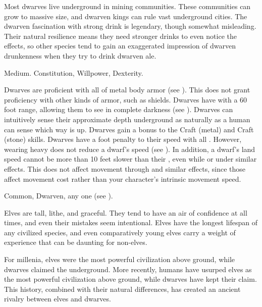   Most dwarves live underground in mining communities.
  These communities can grow to massive size, and dwarven kings can rule vast underground cities.
  The dwarven fascination with strong drink is legendary, though somewhat misleading.
  Their natural resilience means they need stronger drinks to even notice the effects, so other species tend to gain an exaggerated impression of dwarven drunkenness when they try to drink dwarven ale.

   Medium.
    Constitution,  Willpower,  Dexterity.
  \begin{raggeditemize}
     Dwarves are proficient with all  of metal body armor (see ).
      This does not grant proficiency with other kinds of armor, such as shields.
     Dwarves have  with a 60 foot range, allowing them to see in complete darkness (see ).
     Dwarves can intuitively sense their approximate depth underground as naturally as a human can sense which way is up.
     Dwarves gain a  bonus to the Craft (metal) and Craft (stone) skills.
     Dwarves have a  foot penalty to their speed with all .
      However, wearing heavy  does not reduce a dwarf's speed (see ).
      In addition, a dwarf's land speed cannot be more than 10 feet slower than their , even while \slowed or under similar effects.
      This does not affect movement through  and similar effects, since those affect movement cost rather than your character's intrinsic movement speed.
  \end{raggeditemize}
   Common, Dwarven, any one  (see ).


  Elves are tall, lithe, and graceful.
  They tend to have an air of confidence at all times, and even their mistakes seem intentional.
  Elves have the longest lifespan of any civilized species, and even comparatively young elves carry a weight of experience that can be daunting for non-elves.

  For millenia, elves were the most powerful civilization above ground, while dwarves claimed the underground.
  More recently, humans have usurped elves as the most powerful civilization above ground, while dwarves have kept their claim.
  This history, combined with their natural differences, has created an ancient rivalry between elves and dwarves.

